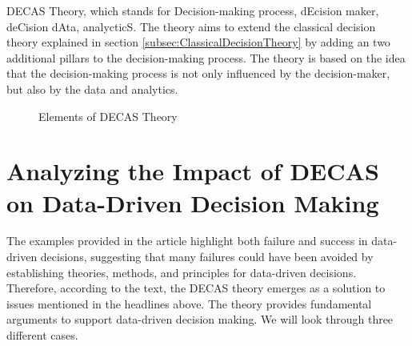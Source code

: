 DECAS Theory, which stands for Decision-making process, dEcision maker, deCision dAta, analycticS. 
The theory aims to extend the classical decision theory explained in section
\ref{subsec:ClassicalDecisionTheory} by adding an two additional pillars to the 
decision-making process. The theory is based on the idea that the decision-making process
is not only influenced by the decision-maker, but also by the data and analytics.

\begin{figure}[h]
    \centering
    \caption{Elements of DECAS Theory}
    \label{fig:DECASElements}
\end{figure}





\section{Analyzing the Impact of DECAS on Data-Driven Decision Making} 
The examples provided in the article highlight both failure and success in data-driven decisions, suggesting that many failures could have been avoided by establishing theories, methods, and principles for data-driven decisions. Therefore, according to the text, the DECAS theory emerges as a solution to issues mentioned in the headlines above. The theory provides fundamental arguments to support data-driven decision making. We will look through three different cases.

